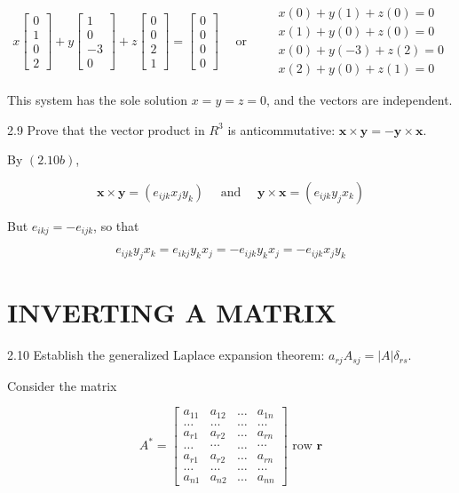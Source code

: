 \documentclass[10pt]{article}
\begin{document}
$$
x\left[\begin{array}{l}
0 \\
1 \\
0 \\
2
\end{array}\right]+y\left[\begin{array}{r}
1 \\
0 \\
-3 \\
0
\end{array}\right]+z\left[\begin{array}{l}
0 \\
0 \\
2 \\
1
\end{array}\right]=\left[\begin{array}{l}
0 \\
0 \\
0 \\
0
\end{array}\right] \quad \text { or } \quad \begin{aligned}
& x(0)+y(1)+z(0)=0 \\
& x(1)+y(0)+z(0)=0 \\
& x(0)+y(-3)+z(2)=0 \\
& x(2)+y(0)+z(1)=0
\end{aligned}
$$

This system has the sole solution $x=y=z=0$, and the vectors are independent.

2.9 Prove that the vector product in $R^{3}$ is anticommutative: $\mathbf{x} \times \mathbf{y}=-\mathbf{y} \times \mathbf{x}$.

By $(2.10 b)$,

$$
\mathbf{x} \times \mathbf{y}=\left(e_{i j k} x_{j} y_{k}\right) \quad \text { and } \quad \mathbf{y} \times \mathbf{x}=\left(e_{i j k} y_{j} x_{k}\right)
$$

But $e_{i k j}=-e_{i j k}$, so that

$$
e_{i j k} y_{j} x_{k}=e_{i k j} y_{k} x_{j}=-e_{i j k} y_{k} x_{j}=-e_{i j k} x_{j} y_{k}
$$

\section*{INVERTING A MATRIX}
2.10 Establish the generalized Laplace expansion theorem: $a_{r j} A_{s j}=|A| \delta_{r s}$.

Consider the matrix

$$
A^{*}=\left[\begin{array}{cccc}
a_{11} & a_{12} & \ldots & a_{1 n} \\
\ldots & \ldots & \ldots & \ldots \\
a_{r 1} & a_{r 2} & \ldots & a_{r n} \\
\ldots & \cdots & \ldots & \cdots \\
a_{r 1} & a_{r 2} & \ldots & a_{r n} \\
\ldots & \ldots & \ldots & \ldots \\
a_{n 1} & a_{n 2} & \ldots & a_{n n}
\end{array}\right] \text { row } \boldsymbol{r}
$$
\end{document}
